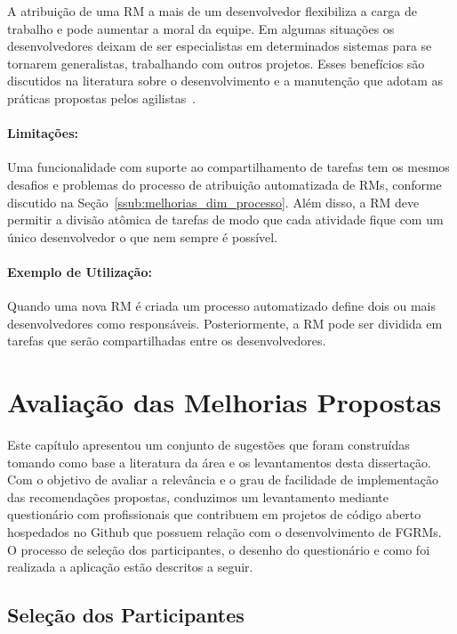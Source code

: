 A atribuição de uma RM a mais de um desenvolvedor flexibiliza a carga de
trabalho e pode aumentar a moral da equipe. Em algumas situações os
desenvolvedores deixam de ser especialistas em determinados sistemas para se
tornarem generalistas, trabalhando com outros projetos. Esses benefícios são
discutidos na literatura sobre o desenvolvimento e a manutenção que adotam as
práticas propostas pelos agilistas~\cite{dybaa2008empirical,rudzki2009agile}.

\paragraph{Limitações:}
\label{par:limitacoes_s08}

Uma funcionalidade com suporte ao compartilhamento de tarefas tem os mesmos
desafios e problemas do processo de atribuição automatizada de RMs, conforme
discutido na Seção~\ref{ssub:melhorias_dim_processo}. Além disso, a RM deve
permitir a divisão atômica de tarefas de modo que cada atividade fique com um
único desenvolvedor o que nem sempre é possível.

\paragraph{Exemplo de Utilização:}
\label{par:exemplo_de_utilização_s08}

Quando uma nova RM é criada um processo automatizado define dois ou mais
desenvolvedores como responsáveis. Posteriormente, a RM pode ser dividida em
tarefas que serão compartilhadas entre os desenvolvedores.

\section{Avaliação das Melhorias Propostas}
\label{sec:sug_melhoria_avaliacao_das_melhorias}

Este capítulo apresentou um conjunto de sugestões que foram construídas tomando
como base a literatura da área e os levantamentos desta dissertação. Com o
objetivo de avaliar a relevância e o grau de facilidade de implementação das
recomendações propostas, conduzimos um levantamento mediante questionário com
profissionais que contribuem em projetos de código aberto hospedados no Github
que possuem relação com o desenvolvimento de FGRMs. O processo de seleção dos
participantes, o desenho do questionário e como foi realizada a aplicação estão
descritos a seguir.

\subsection{Seleção dos Participantes}
\label{ssub:sug_melhoria_selecao_participantes}

